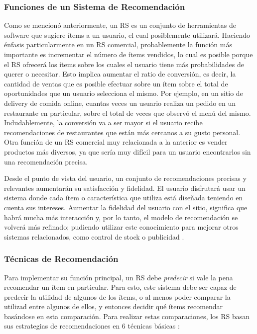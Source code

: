 \subsubsection{Funciones de un Sistema de Recomendación}
Como se mencionó anteriormente, un RS es un conjunto de herramientas de software que sugiere ítems a un usuario, el cual posiblemente utilizará. Haciendo énfasis particularmente en un RS comercial, probablemente la función más importante es incrementar el número de ítems vendidos, lo cual es posible porque el RS ofrecerá los ítems sobre los cuales el usuario tiene más probabilidades de querer o necesitar. Esto implica aumentar el ratio de conversión, es decir, la cantidad de ventas que es posible efectuar sobre un ítem sobre el total de oportunidades que un usuario selecciona el mismo. Por ejemplo, en un sitio de delivery de comida online, cuantas veces un usuario realiza un pedido en un restaurante en particular, sobre el total de veces que observó el menú del mismo. Indudablemente, la conversión va a ser mayor si el usuario recibe recomendaciones de restaurantes que están más cercanos a su gusto personal. Otra función de un RS comercial muy relacionada a la anterior es vender productos más diversos, ya que sería muy difícil para un usuario encontrarlos sin una recomendación precisa.

\bigskip Desde el punto de vista del usuario, un conjunto de recomendaciones precisas y relevantes aumentarán su satisfacción y fidelidad. El usuario disfrutará usar un sistema donde cada ítem o característica que utiliza está diseñada teniendo en cuenta sus intereses. Aumentar la fidelidad del usuario con el sitio, significa que habrá mucha más interacción y, por lo tanto, el modelo de recomendación se volverá más refinado; pudiendo utilizar este conocimiento para mejorar otros sistemas relacionados, como control de stock o publicidad \citep{ricci2011introduction}.

\subsubsection{Técnicas de Recomendación}
Para implementar su función principal, un RS debe \textit{predecir} si vale la pena recomendar un ítem en particular. Para esto, este sistema debe ser capaz de predecir la utilidad de algunos de los ítems, o al menos poder comparar la utilizad entre algunos de ellos, y entonces decidir qué ítems recomendar basándose en esta comparación. Para realizar estas comparaciones, los RS basan sus estrategias de recomendaciones en 6 técnicas básicas \citep{ricci2011introduction}:

